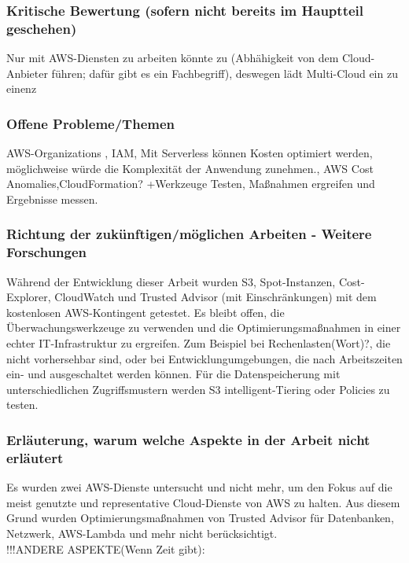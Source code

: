 \subsubsection*{Kritische Bewertung (sofern nicht bereits im Hauptteil geschehen)}
Nur mit AWS-Diensten zu arbeiten könnte zu (Abhähigkeit von dem Cloud-Anbieter führen; dafür gibt es ein Fachbegriff), deswegen lädt Multi-Cloud ein zu einenz

\subsubsection*{Offene Probleme/Themen}
AWS-Organizations%
, IAM, Mit Serverless können Kosten optimiert werden, möglichweise würde die Komplexität der Anwendung zunehmen.,  AWS Cost Anomalies,CloudFormation?
+Werkzeuge Testen, Maßnahmen ergreifen und Ergebnisse messen.
\subsubsection*{Richtung der zukünftigen/möglichen Arbeiten - Weitere Forschungen}
Während der Entwicklung dieser Arbeit wurden S3, Spot-Instanzen, Cost-Explorer, CloudWatch und Trusted Advisor (mit Einschränkungen) mit dem kostenlosen AWS-Kontingent getestet. 
Es bleibt offen, die Überwachungswerkzeuge zu verwenden und die Optimierungsmaßnahmen in einer echter IT-Infrastruktur zu ergreifen. 
Zum Beispiel bei Rechenlasten(Wort)?, die nicht vorhersehbar sind, oder bei Entwicklungumgebungen, die nach Arbeitszeiten ein- und ausgeschaltet werden können. Für die Datenspeicherung mit unterschiedlichen Zugriffsmustern werden S3 intelligent-Tiering oder Policies zu testen.%

\subsubsection*{Erläuterung, warum welche Aspekte in der Arbeit nicht erläutert} 
Es wurden zwei AWS-Dienste untersucht und nicht mehr, um den Fokus auf die meist genutzte und representative Cloud-Dienste von AWS zu halten. Aus diesem Grund wurden Optimierungsmaßnahmen von Trusted Advisor für Datenbanken, Netzwerk, AWS-Lambda und mehr nicht berücksichtigt.
\\!!!ANDERE ASPEKTE(Wenn Zeit gibt):\\

